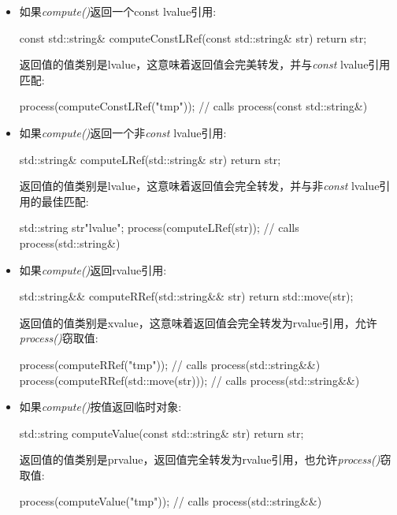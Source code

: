 \begin{itemize}
	\item 如果\textit{compute()}返回一个const lvalue引用:

\begin{cppcode}
const std::string& computeConstLRef(const std::string& str) {
	return str;
}
\end{cppcode}
返回值的值类别是lvalue，这意味着返回值会完美转发，并与\textit{const} lvalue引用匹配:

\begin{cppcode}
process(computeConstLRef("tmp")); // calls process(const std::string&)
\end{cppcode}
\item 如果\textit{compute()}返回一个非\textit{const} lvalue引用:

\begin{cppcode}
std::string& computeLRef(std::string& str) {
	return str;
}
\end{cppcode}
返回值的值类别是lvalue，这意味着返回值会完全转发，并与非\textit{const} lvalue引用的最佳匹配:

\begin{cppcode}
std::string str{"lvalue"};
process(computeLRef(str)); // calls process(std::string&)
\end{cppcode}
\item 如果\textit{compute()}返回rvalue引用:

\begin{cppcode}
std::string&& computeRRef(std::string&& str) {
	return std::move(str);
}
\end{cppcode}
返回值的值类别是xvalue，这意味着返回值会完全转发为rvalue引用，允许\textit{process()}窃取值:

\begin{cppcode}
process(computeRRef("tmp")); // calls process(std::string&&)
process(computeRRef(std::move(str))); // calls process(std::string&&)
\end{cppcode}
\item 如果\textit{compute()}按值返回临时对象:

\begin{cppcode}
std::string computeValue(const std::string& str) {
	return str;
}
\end{cppcode}
返回值的值类别是prvalue，返回值完全转发为rvalue引用，也允许\textit{process()}窃取值:

\begin{cppcode}
process(computeValue("tmp")); // calls process(std::string&&)
\end{cppcode}
\end{itemize}


